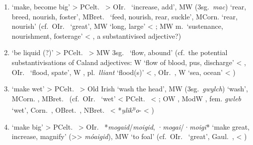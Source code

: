 \documentclass[output=paper,colorlinks,citecolor=brown]{langscibook}
\begin{document}
\begin{itemize}
\begin{enumerate}
    \item \label{ref:itembig} ‘make, become big’ > PCelt.\  > OIr.\   ‘increase, add’, MW  (3sg.\ \textit{mac}) ‘rear, breed, nourish, foster’, MBret.\  ‘feed, nourish, rear, suckle’, MCorn.  ‘rear, nourish’ 
        (cf.\ OIr.\   ‘great’, MW  ‘long, large’ < ; MW  m.\ ‘sustenance, nourishment, fosterage’ < , a substantivised adjective?)

    \item \label{ref:itemliquid} ‘be liquid (?)’ > PCelt.\  > MW 3sg.\  ‘flow, abound’ 
        (cf.\ the potential substantivisations of Caland adjectives:  W  ‘flow of blood, pus, dis\-charge’ < , OIr.\   ‘flood, spate’, W , pl.\ \textit{lliant} ‘flood(s)’ < , OIr.\  , W  ‘sea, ocean’ < )

    \item \label{ref:itemwet} ‘make wet’ > PCelt.\  > Old Irish   ‘wash the head’, MW  (3sg.\ \textit{gwylch}) ‘wash’, MCorn. , MBret.\  
        (cf.\ OIr.\   ‘wet’ < PCelt.\  < ; OW , ModW , fem. \textit{gwleb} ‘wet’, Corn.\ , OBret.\ , NBret.\  < *\textit{u̯lik\textsuperscript{u̯}o}- < )

    \item \label{ref:itemmog} ‘make big’ > PCelt.\  > OIr.\   *\textit{mogaid}/\textit{moigid}, \mbox{·\textit{mogai}/}·\textit{moigi}* ‘make great, increase, magnify’ (>{>} \textit{móaigid}), MW  ‘to foal’ 
        (cf.\ OIr.\   ‘great’, Gaul.\ ,  < )

\end{enumerate}
\end{itemize}
\end{document}
